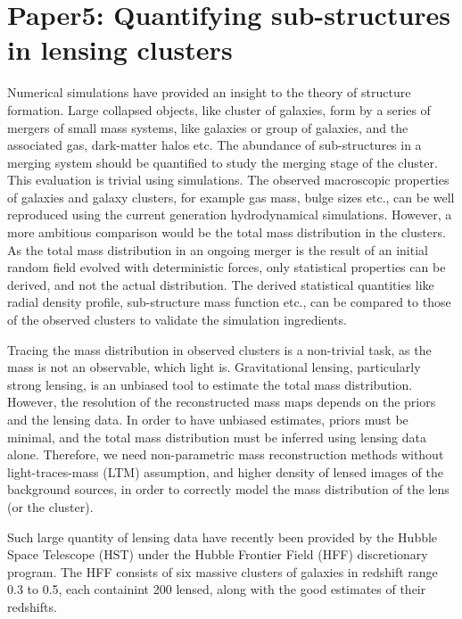 \chapter{Paper5: Quantifying sub-structures in lensing clusters}\label{paper:substructures}

Numerical simulations have provided an insight to the theory of structure formation. 
Large collapsed objects, like cluster of galaxies, form by a series of mergers of 
small mass systems, like galaxies or group of galaxies, and the associated gas, dark-matter
halos etc. The abundance of sub-structures in a merging system should be quantified 
to study the merging stage of the cluster. This evaluation is trivial using simulations. 
The observed macroscopic properties of galaxies and galaxy clusters, for example 
gas mass, bulge sizes
etc., can be well reproduced using the current generation hydrodynamical simulations. 
However, a more ambitious comparison would be the total mass distribution in the
clusters. As the total mass distribution in an ongoing merger is the result
of an initial random field evolved with deterministic forces, only statistical
properties can be derived, and not the actual distribution. The derived statistical
quantities like radial density profile, sub-structure mass function etc., can be
compared to those of the observed clusters to validate the simulation
ingredients. 

Tracing the mass distribution in observed clusters is a non-trivial task, as 
the mass is not an observable, which light is. Gravitational lensing, particularly
strong lensing, is an unbiased 
tool to estimate the total mass distribution. However, the resolution of the
reconstructed mass maps depends on the priors and the lensing data. In order to
have unbiased estimates, priors must be minimal, and the total mass distribution
must be inferred using lensing data alone. Therefore, we need non-parametric
mass reconstruction methods without light-traces-mass (LTM) assumption, and higher
density of lensed images of the background sources, in order to correctly model 
the mass distribution of the lens (or the cluster).

Such large quantity of lensing data have recently been provided by the Hubble Space
Telescope (HST) under the Hubble Frontier Field (HFF) discretionary program. The HFF 
consists of six massive clusters of galaxies in redshift range 0.3 to 0.5, each 
containint 200 lensed, along 
with the good estimates of their redshifts. 

